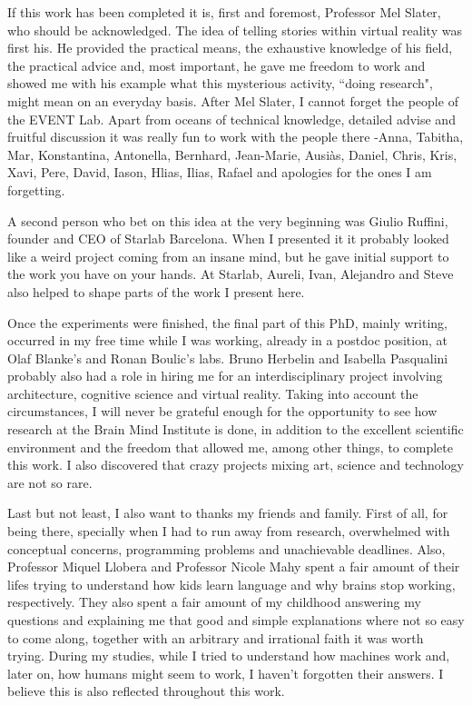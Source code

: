 \documentclass[
		twoside,openright,titlepage,numbers=noenddot,manychapters,
		headinclude,%
                footinclude=false,cleardoublepage=empty,
                BCOR=5mm,
		fontsize=11pt, %
                 enabledeprecatedfontcommands]{scrreprt}
\begin{document}
If this work has been completed it is, first and foremost, Professor Mel Slater, who should be acknowledged. The idea of telling stories within virtual reality was first his. He provided the practical means, the exhaustive knowledge of his field, the practical advice and, most important, he gave me freedom to work and showed me with his example what this mysterious activity, ``doing research", might mean on an everyday basis. 
After Mel Slater, I cannot forget the people of the EVENT Lab. Apart from oceans of technical knowledge, detailed advise and fruitful discussion it was really fun to work with the people there -Anna, Tabitha, Mar, Konstantina, Antonella, Bernhard, Jean-Marie, Ausi\`{a}s, Daniel, Chris, Kris, Xavi, Pere, David, Iason, Hlias, Ilias, Rafael and apologies for the ones I am forgetting.
 
A second person who bet on this idea at the very beginning was Giulio Ruffini, founder and CEO of Starlab Barcelona. When I presented it it probably looked like a weird project coming from an insane mind, but he gave initial support to the work you have on your hands. %
 At Starlab, Aureli, Ivan, Alejandro and Steve also helped to shape parts of the work I present here.


Once the experiments were finished, the final part of this PhD, mainly writing, occurred in my free time while I was working, already in a postdoc position, at Olaf Blanke's and Ronan Boulic's labs. Bruno Herbelin and Isabella Pasqualini probably also had a role in hiring me for an interdisciplinary project involving architecture, cognitive science and virtual reality.
Taking into account the circumstances, I will never be grateful enough for the opportunity to see how research at the Brain Mind Institute is done, in addition to the excellent scientific environment and the freedom that allowed me, among other things, to complete this work. I also discovered that crazy projects mixing art, science and technology are not so rare.


Last but not least, I also want to thanks my friends and family. First of all, for being there, specially when I had to run away from research, overwhelmed with conceptual concerns, programming problems and unachievable deadlines. Also, Professor Miquel Llobera and Professor Nicole Mahy spent a fair amount of their lifes trying to understand how kids learn language and why brains stop working, respectively. They also spent a fair amount of my childhood answering my questions and explaining me that good and simple explanations where not so easy to come along, together with an arbitrary and irrational faith it was worth trying. During my studies, while I tried to understand how machines work and, later on, how humans might seem to  work, I haven't forgotten their answers. I believe this is also reflected throughout  this work.
\end{document}
